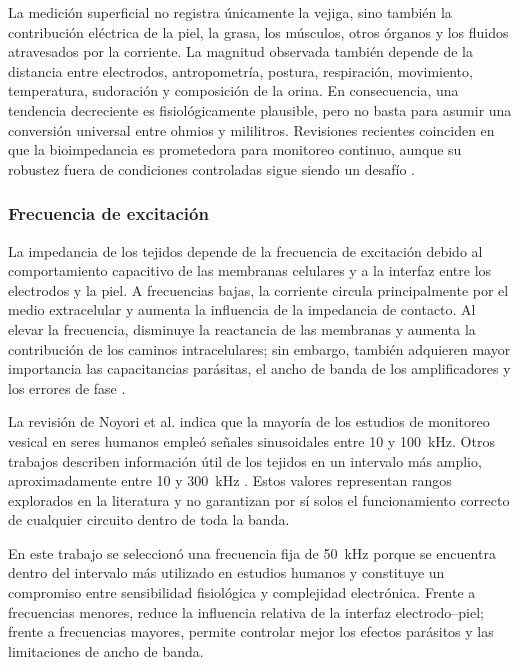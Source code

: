 \documentclass[12pt,a4paper]{article}
\begin{document}
La medición superficial no registra únicamente la vejiga, sino también la contribución eléctrica de
la piel, la grasa, los músculos, otros órganos y los fluidos atravesados por la corriente. La magnitud observada también depende de la distancia
entre electrodos, antropometría, postura, respiración, movimiento, temperatura, sudoración y composición
de la orina. En consecuencia, una tendencia decreciente es fisiológicamente plausible, pero no basta
para asumir una conversión universal entre ohmios y mililitros. Revisiones recientes coinciden en que la bioimpedancia es
prometedora para monitoreo continuo, aunque su robustez fuera de condiciones controladas sigue siendo
un desafío \cite{li2013monitoring,palla2023review,noyori2022review}.

\subsubsection{Frecuencia de excitación}

La impedancia de los tejidos depende de la frecuencia de excitación debido al comportamiento capacitivo
de las membranas celulares y a la interfaz entre los electrodos y la piel. A frecuencias bajas, la
corriente circula principalmente por el medio extracelular y aumenta la influencia de la impedancia de
contacto. Al elevar la frecuencia, disminuye la reactancia de las membranas y aumenta la contribución de
los caminos intracelulares; sin embargo, también adquieren mayor importancia las capacitancias parásitas,
el ancho de banda de los amplificadores y los errores de fase \cite{grimnes2015bioimpedance}.

La revisión de Noyori et al. indica que la mayoría de los estudios de monitoreo vesical en seres humanos
empleó señales sinusoidales entre 10 y 100~kHz. Otros trabajos describen información útil de los tejidos
en un intervalo más amplio, aproximadamente entre 10 y 300~kHz
\cite{noyori2022review,li2013monitoring}. Estos valores representan rangos explorados en la literatura y
no garantizan por sí solos el funcionamiento correcto de cualquier circuito dentro de toda la banda.

En este trabajo se seleccionó una frecuencia fija de 50~kHz porque se encuentra dentro del intervalo más
utilizado en estudios humanos y constituye un compromiso entre sensibilidad fisiológica y complejidad
electrónica. Frente a frecuencias menores, reduce la influencia relativa de la interfaz electrodo--piel;
frente a frecuencias mayores, permite controlar
mejor los efectos parásitos y las limitaciones de ancho de banda.
\end{document}
